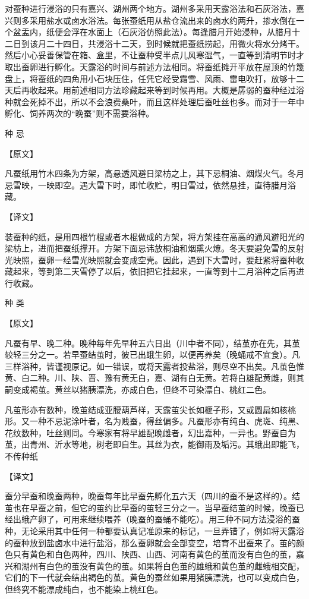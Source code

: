 \documentclass[12pt,UTF8]{ctexbook}
\begin{document}
对蚕种进行浸浴的只有嘉兴、湖州两个地方。湖州多采用天露浴法和石灰浴法，嘉兴则多采用盐水或卤水浴法。每张蚕纸用从盐仓流出来的卤水约两升，掺水倒在一个盆盂内，纸便会浮在水面上（石灰浴仿照此法）。每逢腊月开始浸种，从腊月十二日到该月二十四日，共浸浴十二天，到时候就把蚕纸捞起，用微火将水分烤干。然后小心妥善保管在箱、盒里，不让蚕种受半点儿风寒湿气，一直等到清明节时才取出蚕卵进行孵化。天露浴的时间与前述方法相同。将蚕纸摊开平放在屋顶的竹篾盘上，将蚕纸的四角用小石块压住，任凭它经受霜雪、风雨、雷电吹打，放够十二天后再收起来。用前述相同方法珍藏起来等到时候再用。大概是孱弱的蚕种经过浴种就会死掉不出，所以不会浪费桑叶，而且这样处理后蚕吐丝也多。而对于一年中孵化、饲养两次的“晚蚕”则不需要浴种。

种 忌

【原文】

凡蚕纸用竹木四条为方架，高悬透风避日梁枋之上，其下忌桐油、烟煤火气。冬月忌雪映，一映即空。遇大雪下时，即忙收贮，明日雪过，依然悬挂，直待腊月浴藏。

【译文】

装蚕种的纸，是用四根竹棍或者木棍做成的方架，将方架挂在高高的通风避阳光的梁枋上，进而把蚕纸撑开。方架下面忌讳放桐油和烟熏火燎。冬天要避免雪的反射光映照，蚕卵一经雪光映照就会变成空壳。因此，遇到下大雪时，要赶紧将蚕种收藏起来，等到第二天雪停了以后，依旧把它挂起来，一直等到十二月浴种之后再进行收藏。

种 类

【原文】

凡蚕有早、晚二种。晚种每年先早种五六日出（川中者不同），结茧亦在先，其茧较轻三分之一。若早蚕结茧时，彼已出蛾生卵，以便再养矣（晚蛹戒不宜食）。凡三样浴种，皆谨视原记。如一错误，或将天露者投盐浴，则尽空不出矣。凡茧色惟黄、白二种。川、陕、晋、豫有黄无白，嘉、湖有白无黄。若将白雄配黄雌，则其嗣变成褐茧。黄丝以猪胰漂洗，亦成白色，但终不可染漂白、桃红二色。

凡茧形亦有数种，晚茧结成亚腰葫芦样，天露茧尖长如榧子形，又或圆扁如核桃形。又一种不忌泥涂叶者，名为贱蚕，得丝偏多。凡蚕形亦有纯白、虎斑、纯黑、花纹数种，吐丝则同。今寒家有将早雄配晚雌者，幻出嘉种，一异也。野蚕自为茧，出青州、沂水等地，树老即自生。其丝为衣，能御雨及垢污。其蛾出即能飞，不传种纸

【译文】

蚕分早蚕和晚蚕两种，晚蚕每年比早蚕先孵化五六天（四川的蚕不是这样的）。结茧也在早蚕之前，但它的茧约比早蚕的茧轻三分之一。当早蚕结茧的时候，晚蚕已经出蛾产卵了，可用来继续喂养（晚蚕的蚕蛹不能吃）。用三种不同方法浸浴的蚕种，无论采用其中任何一种都要认真记准原来的标记，一旦弄错了，例如将天露浴的蚕种放到盐卤水中进行盐浴，那么蚕卵就会全部变空，培育不出蚕来了。茧的颜色只有黄色和白色两种，四川、陕西、山西、河南有黄色的茧而没有白色的茧，嘉兴和湖州有白色的茧没有黄色的茧。如果将白色茧的雄蛾和黄色茧的雌蛾相交配，它们的下一代就会结出褐色的茧。黄色的蚕丝如果用猪胰漂洗，也可以变成白色，但终究不能漂成纯白，也不能染上桃红色。
\end{document}
